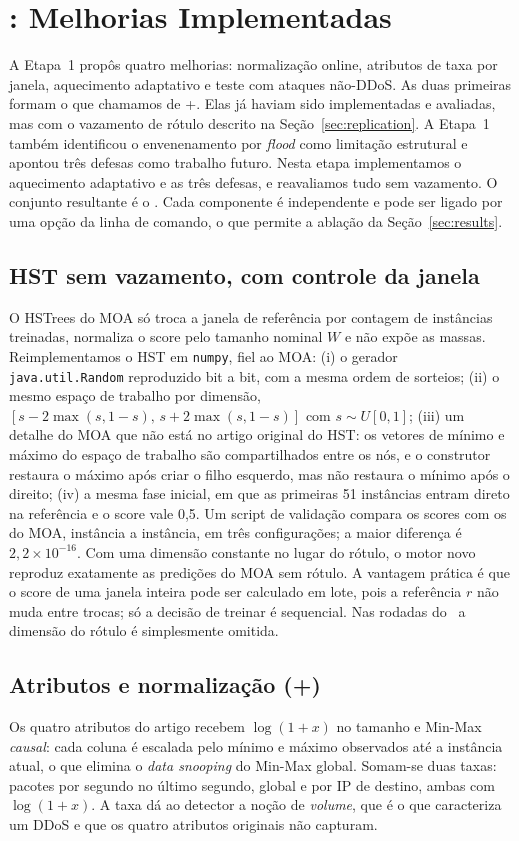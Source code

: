 \section{\modusp: Melhorias Implementadas}
\label{sec:method}

A Etapa~1 propôs quatro melhorias: normalização online, atributos de taxa por janela, aquecimento
adaptativo e teste com ataques não-DDoS. As duas primeiras formam o que chamamos de \modus+.
Elas já haviam sido implementadas e avaliadas, mas com o vazamento de rótulo descrito na
Seção~\ref{sec:replication}. A Etapa~1 também identificou o envenenamento por \emph{flood} como
limitação estrutural e apontou três defesas como trabalho futuro. Nesta etapa implementamos o
aquecimento adaptativo e as três defesas, e reavaliamos tudo sem vazamento. O conjunto resultante é
o \modusp. Cada componente é independente e pode ser ligado por uma opção da linha de comando, o
que permite a ablação da Seção~\ref{sec:results}.

\subsection{HST sem vazamento, com controle da janela}
\label{sec:hstnp}
O HSTrees do MOA só troca a janela de referência por contagem de instâncias treinadas, normaliza o
score pelo tamanho nominal $W$ e não expõe as massas. Reimplementamos o HST em
\texttt{numpy}, fiel ao MOA:
(i) o gerador \texttt{java.util.Random} reproduzido bit a bit, com a mesma ordem de sorteios;
(ii) o mesmo espaço de trabalho por dimensão, $[s-2\max(s,1-s),\, s+2\max(s,1-s)]$ com
$s\sim U[0,1]$;
(iii) um detalhe do MOA que não está no artigo original do HST: os vetores de mínimo e máximo do
espaço de trabalho são compartilhados entre os nós, e o construtor restaura o máximo após criar o
filho esquerdo, mas não restaura o mínimo após o direito;
(iv) a mesma fase inicial, em que as primeiras 51 instâncias entram direto na referência e o score
vale 0,5.
Um script de validação compara os scores com os do MOA, instância a instância, em três
configurações; a maior diferença é $2{,}2\times10^{-16}$. Com uma dimensão constante no lugar do
rótulo, o motor novo reproduz exatamente as predições do MOA sem rótulo. A vantagem prática é que
o score de uma janela inteira pode ser calculado em lote, pois a referência $r$ não muda entre
trocas; só a decisão de treinar é sequencial. Nas rodadas do \modusp\ a dimensão do rótulo é
simplesmente omitida.

\subsection{Atributos e normalização (\modus+)}
Os quatro atributos do artigo recebem $\log(1+x)$ no tamanho e Min-Max \emph{causal}: cada coluna
é escalada pelo mínimo e máximo observados até a instância atual, o que elimina o
\emph{data snooping} do Min-Max global. Somam-se duas taxas: pacotes por segundo no último segundo,
global e por IP de destino, ambas com $\log(1+x)$. A taxa dá ao detector a noção de \emph{volume},
que é o que caracteriza um DDoS e que os quatro atributos originais não capturam.


